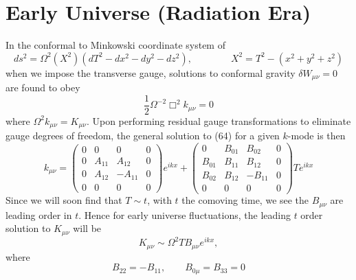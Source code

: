 \documentclass[10pt,letterpaper]{article}
\begin{document}
\section*{Early Universe (Radiation Era)}
In the conformal to Minkowski coordinate system of
\begin{equation}
ds^2 = \Omega^2(X^2)( dT^2 - dx^2 - dy^2 - dz^2),\qquad\qquad X^2 = T^2-(x^2+y^2+z^2)
\end{equation}
when we impose the transverse gauge,
solutions to conformal gravity $\delta W_{\mu\nu} = 0$ are found to obey
\begin{equation}
\frac{1}{2}\Omega^{-2}\Box^2 k_{\mu\nu} = 0
\end{equation}
where $\Omega^2 k_{\mu\nu} = K_{\mu\nu}$. Upon performing residual gauge transformations to eliminate gauge degrees of freedom, the general solution to (64) for a given $k$-mode is then
\begin{equation}
k_{\mu\nu} = 
 \begin{pmatrix}0&0&0&0\\0&A_{11}&A_{12}&0\\0&A_{12}&-A_{11}&0\\0&0&0&0\end{pmatrix}e^{ikx} + \begin{pmatrix}
0&B_{01}&B_{02}&0\\B_{01}&B_{11}&B_{12}&0\\B_{02}&B_{12}&-B_{11}&0\\0&0&0&0  \end{pmatrix}T e^{ikx} 
\end{equation}
Since we will soon find that $T \sim t$, with $t$ the comoving time, we see the $B_{\mu\nu}$ are leading order in $t$. Hence for early universe fluctuations, the leading $t$ order solution to $K_{\mu\nu}$ will be
\begin{equation}
K_{\mu\nu} \sim \Omega^2 TB_{\mu\nu}e^{ikx},
\end{equation}
where 
\begin{equation}
B_{22}= -B_{11},\qquad B_{0\mu} = B_{33} = 0
\end{equation}
\end{document}
